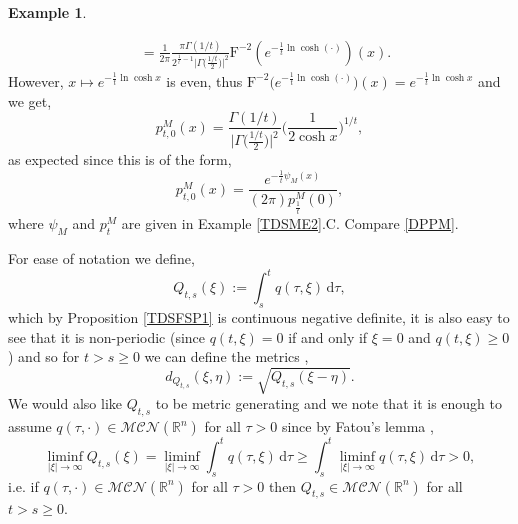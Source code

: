 \documentclass[a4paper, 12pt]{report}
\theoremstyle{remark}
\theoremstyle{definition}
\newtheorem{example}[theorem]{Example}
\begin{document}
\begin{example}
\begin{itemize}
$$\begin{aligned}
& = \frac{1}{2\pi}\frac{\pi\Gamma(1/t)}{2^{\frac{1}{t} - 1}\big|\Gamma\big(\frac{1/t}{2}\big)\big|^2}\mathrm{F}^{-2}\left(e^{-\frac{1}{t}\ln\cosh(\cdot)}\right)(x).
\end{aligned}
$$
However, $x \mapsto e^{-\frac{1}{t}\ln\cosh x}$ is even, thus $\mathrm{F}^{-2}\big(e^{-\frac{1}{t}\ln\cosh(\cdot)}\big)(x) = e^{-\frac{1}{t}\ln\cosh x}$ and we get,
$$
p_{t, 0}^M(x) = \frac{\Gamma(1/t)}{\big|\Gamma\big(\frac{1/t}{2}\big)\big|^2}\bigg(\frac{1}{2\cosh x}\bigg)^{1/t},
$$
as expected since this is of the form,
$$
p_{t, 0}^M(x) = \frac{e^{-\frac{1}{t}\psi_M(x)}}{(2\pi)p_\frac{1}{t}^M(0)},
$$
where $\psi_M$ and $p_t^M$ are given in Example \ref{TDSME2}.C.  Compare \eqref{DPPM}.
\end{itemize}
\end{example}
For ease of notation we define,
\begin{equation}
Q_{t, s}(\xi) := \int_s^t q(\tau, \xi)\,\mathrm{d}\tau,\label{Q}
\end{equation}
which by Proposition \ref{TDSFSP1} is continuous negative definite, it is also easy to see that it is non-periodic (since $q(t, \xi) = 0$ if and only if $\xi = 0$ and $q(t, \xi) \ge 0$) and so for $t > s \ge 0$ we can define the metrics \cite{Paper},
\begin{equation}
d_{Q_{t, s}}(\xi, \eta) := \sqrt{Q_{t, s}(\xi - \eta)}\label{M}.
\end{equation}
We would also like $Q_{t, s}$ to be metric generating and we note that it is enough to assume $q(\tau, \cdot) \in \mathcal{MCN}(\mathbb{R}^n)$ for all $\tau > 0$ since by Fatou's lemma \cite[Theorem 9.11]{FubiniBook},
$$
\liminf_{|\xi| \to \infty} Q_{t, s}(\xi) = \liminf_{|\xi| \to \infty}\int_s^tq(\tau, \xi)\,\mathrm{d}\tau \ge \int_s^t\liminf_{|\xi| \to \infty} q(\tau, \xi)\,\mathrm{d}\tau > 0,
$$
i.e. if $q(\tau, \cdot) \in \mathcal{MCN}(\mathbb{R}^n)$ for all $\tau > 0$ then $Q_{t, s} \in \mathcal{MCN}(\mathbb{R}^n)$ for all $t > s \ge 0$.
\end{document}
